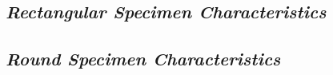 \documentclass[11pt,a4paper]{article}
\numberwithin{equation}{subsection}
\begin{document}



\pagebreak
\cleardoublepage
{}

\appendixtitleon

\begin{appendices}
	\section{\textit{Rectangular Specimen Characteristics}}
\pagebreak

\end{appendices}

\begin{appendices}
	\section{\textit{Round Specimen Characteristics}}
	\pagebreak
	
\end{appendices}
\end{document}

